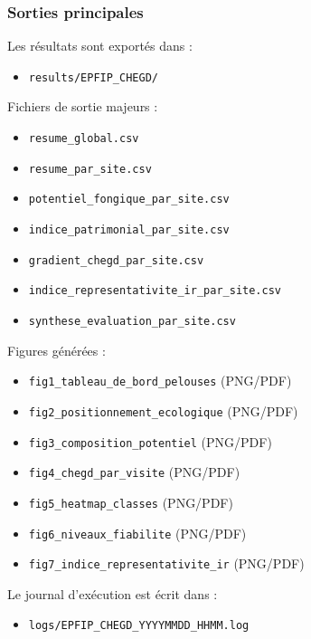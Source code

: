 \subsubsection{Sorties principales}\label{sorties-principales}

Les résultats sont exportés dans :

\begin{itemize}
\tightlist
\item
  \texttt{results/EPFIP\_CHEGD/}
\end{itemize}

Fichiers de sortie majeurs :

\begin{itemize}
\tightlist
\item
  \texttt{resume\_global.csv}
\item
  \texttt{resume\_par\_site.csv}
\item
  \texttt{potentiel\_fongique\_par\_site.csv}
\item
  \texttt{indice\_patrimonial\_par\_site.csv}
\item
  \texttt{gradient\_chegd\_par\_site.csv}
\item
  \texttt{indice\_representativite\_ir\_par\_site.csv}
\item
  \texttt{synthese\_evaluation\_par\_site.csv}
\end{itemize}

Figures générées :

\begin{itemize}
\tightlist
\item
  \texttt{fig1\_tableau\_de\_bord\_pelouses} (PNG/PDF)
\item
  \texttt{fig2\_positionnement\_ecologique} (PNG/PDF)
\item
  \texttt{fig3\_composition\_potentiel} (PNG/PDF)
\item
  \texttt{fig4\_chegd\_par\_visite} (PNG/PDF)
\item
  \texttt{fig5\_heatmap\_classes} (PNG/PDF)
\item
  \texttt{fig6\_niveaux\_fiabilite} (PNG/PDF)
\item
  \texttt{fig7\_indice\_representativite\_ir} (PNG/PDF)
\end{itemize}

Le journal d'exécution est écrit dans :

\begin{itemize}
\tightlist
\item
  \texttt{logs/EPFIP\_CHEGD\_YYYYMMDD\_HHMM.log}
\end{itemize}

